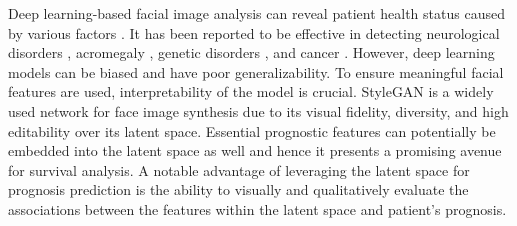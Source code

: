 \documentclass[runningheads]{llncs}
\begin{document}
Deep learning-based facial image analysis can reveal patient health status caused by various factors \cite{su2021deep}. It has been reported to be effective in detecting neurological disorders \cite{yolcu2017deep}, acromegaly \cite{kong2018automatic}, genetic disorders \cite{gurovich2019identifying}, and cancer \cite{liang2020identification}.
However, deep learning models can be biased \cite{wallis2022clever} and have poor generalizability. 
To ensure meaningful facial features are used, interpretability of the model is crucial. StyleGAN \cite{karras2020training,karras2020analyzing} is a widely used network for face image synthesis due to its visual fidelity, diversity, and high editability over its latent space. 
Essential prognostic features can potentially be embedded into the latent space as well and hence it presents a promising avenue for survival analysis. A notable advantage of leveraging the latent space for prognosis prediction is the ability to visually and qualitatively evaluate the associations between the features within the latent space and patient's prognosis.
\end{document}
